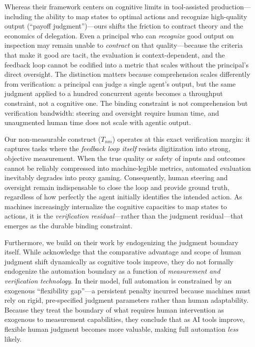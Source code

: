 \documentclass[12pt, letter]{article}
\begin{document}
\begin{itemize}
    Whereas their framework centers on cognitive limits in tool-assisted production---including the ability to map states to optimal actions and recognize high-quality output (``payoff judgment'')---ours shifts the friction to contract theory and the economics of delegation. Even a principal who can \emph{recognize} good output on inspection may remain unable to \emph{contract} on that quality---because the criteria that make it good are tacit, the evaluation is context-dependent, and the feedback loop cannot be codified into a metric that scales without the principal's direct oversight. The distinction matters because comprehension scales differently from verification: a principal can judge a single agent's output, but the same judgment applied to a hundred concurrent agents becomes a throughput constraint, not a cognitive one. The binding constraint is not comprehension but verification bandwidth: steering and oversight require human time, and unaugmented human time does not scale with agentic output.
    
    Our non-measurable construct ($T_{nm}$) operates at this exact verification margin: it captures tasks where the \emph{feedback loop itself} resists digitization into strong, objective measurement. When the true quality or safety of inputs and outcomes cannot be reliably compressed into machine-legible metrics, automated evaluation inevitably degrades into proxy gaming. Consequently, human steering and oversight remain indispensable to close the loop and provide ground truth, regardless of how perfectly the agent initially identifies the intended action. As machines increasingly internalize the cognitive capacities to map states to actions, it is the \emph{verification residual}---rather than the judgment residual---that emerges as the durable binding constraint.

    Furthermore, we build on their work by endogenizing the judgment boundary itself. While \citet{AgrawalGansGoldfarbBicycles} acknowledge that the comparative advantage and scope of human judgment shift dynamically as cognitive tools improve, they do not formally endogenize the automation boundary as a function of \emph{measurement and verification technology}. In their model, full automation is constrained by an exogenous ``flexibility gap''---a persistent penalty incurred because machines must rely on rigid, pre-specified judgment parameters rather than human adaptability. Because they treat the boundary of what requires human intervention as exogenous to measurement capabilities, they conclude that as AI tools improve, flexible human judgment becomes more valuable, making full automation \emph{less} likely. 


\end{itemize}
\end{document}
